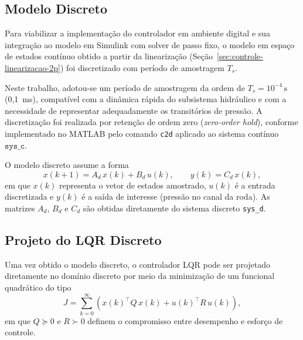 \subsection{Modelo Discreto}
\label{sec:modelo-discreto}

Para viabilizar a implementação do controlador em ambiente digital e sua integração ao modelo em Simulink com solver de passo fixo, o modelo em espaço de estados contínuo obtido a partir da linearização (Seção~\ref{sec:controle-linearizacao-2p}) foi discretizado com período de amostragem $T_s$.

Neste trabalho, adotou-se um período de amostragem da ordem de $T_s = 10^{-4}\,\text{s}$ (0{,}1~ms), compatível com a dinâmica rápida do subsistema hidráulico e com a necessidade de representar adequadamente os transitórios de pressão. A discretização foi realizada por retenção de ordem zero (\textit{zero-order hold}), conforme implementado no MATLAB pelo comando \texttt{c2d} aplicado ao sistema contínuo $\texttt{sys\_c}$.

O modelo discreto assume a forma
\begin{equation}
x(k+1) = A_d\,x(k) + B_d\,u(k),
\qquad
y(k) = C_d\,x(k),
\end{equation}
em que $x(k)$ representa o vetor de estados amostrado, $u(k)$ é a entrada discretizada e $y(k)$ é a saída de interesse (pressão no canal da roda). As matrizes $A_d$, $B_d$ e $C_d$ são obtidas diretamente do sistema discreto \texttt{sys\_d}.

\subsection{Projeto do LQR Discreto}
\label{sec:projeto-lqr-discreto}

Uma vez obtido o modelo discreto, o controlador LQR pode ser projetado diretamente no domínio discreto por meio da minimização de um funcional quadrático do tipo
\begin{equation}
J = \sum_{k=0}^{\infty} \left( x(k)^\top Q\,x(k) + u(k)^\top R\,u(k) \right),
\end{equation}
em que $Q \succeq 0$ e $R \succ 0$ definem o compromisso entre desempenho e esforço de controle.

